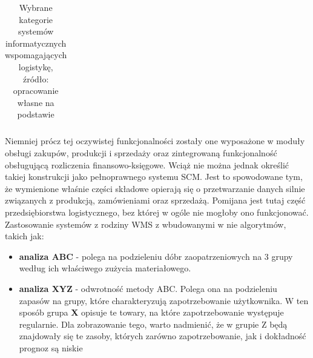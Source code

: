 \begin{center}
\begin{longtable}{| l | l | p{9.5cm} |}
				\caption[Wybrane kategorie systemów wspomagających logistykę]{
					Wybrane kategorie systemów informatycznych wspomagających logistykę,\\
					źródło: opracowanie własne na podstawie \cite{IDL}
				}
			\end{longtable}
		\end{center}
		Niemniej prócz tej oczywistej funkcjonalności zostały one wyposażone w moduły obsługi zakupów, produkcji i sprzedaży oraz zintegrowaną
		funkcjonalność obsługującą rozliczenia finansowo-księgowe. Wciąż nie można jednak określić takiej
		konstrukcji jako pełnoprawnego systemu SCM. Jest to spowodowane tym, że wymienione właśnie części składowe
		opierają się o przetwarzanie danych silnie związanych z produkcją, zamówieniami oraz sprzedażą. Pomijana 
		jest tutaj część przedsiębiorstwa logistycznego, bez której w ogóle nie mogłoby ono funkcjonować.
		Zastosowanie systemów z rodziny WMS z wbudowanymi w nie algorytmów, takich jak:
		\begin{itemize}
			\item \textbf{analiza ABC} - polega na podzieleniu dóbr zaopatrzeniowych na 3 grupy według ich właściwego zużycia materiałowego.
			\item \textbf{analiza XYZ} - odwrotność metody ABC. Polega ona na podzieleniu zapasów na grupy, które charakteryzują
			zapotrzebowanie użytkownika. W ten sposób grupa \textbf{X} opisuje te towary, na które zapotrzebowanie występuje regularnie.
			Dla zobrazowanie tego, warto nadmienić, że w grupie Z będą znajdowały się te zasoby, których zarówno zapotrzebowanie, 
			jak i dokładność prognoz są niskie 
		\end{itemize}
		
